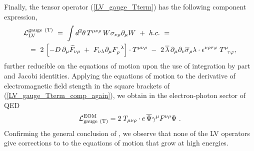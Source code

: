 \documentclass[12pt]{revtex4}
\begin{document}
Finally, the tensor operator (\ref{LV_gauge_Tterm}) has the following component 
expression,
\begin{eqnarray}
\nonumber
\lefteqn{
\mathcal{L}_{\mathrm{LV}}^{\mathrm{gauge\ (T)}}  ~=~ 
\int d^2\theta \, T^{\mu\nu\rho} \,
        W \sigma_{\nu\rho} \partial_\mu W  ~+~ h.c. ~=~ } \\
\label{LV_gauge_Tterm_comp_again}
        &&
        =~
2\,
\left[
   - D\, \partial_\mu \widetilde{F}_{\nu\rho} 
   ~+~
   F_{\nu\lambda}\partial_\mu F_\rho^{\phantom{\rho}\lambda}
\right] 
\cdot
	T^{\mu\nu\rho}
	~-~
	2\,
    	\overline{\lambda}\, \partial_\mu \partial_\nu
    	\overline{\sigma}_\rho \lambda
	\cdot
   	\epsilon^{\nu\rho\tau\varphi}
	\;
   	T^\mu_{\phantom{\mu}\tau\varphi},
\end{eqnarray}
 further reducible on the equations of motion
upon the use of integration by part and Jacobi identities.    
Applying the equations of motion to the derivative of
electromagnetic field stength in the square brackets of 
(\ref{LV_gauge_Tterm_comp_again}), we obtain in the
electron-photon sector of QED
\begin{eqnarray}
        \mathcal{L}_{\rm gauge\ (T)}^{\rm EOM} =  
\label{LV_induced_by_gauge_T}
	2\; T_{\mu\nu\rho} \cdot 
	e\, \overline{\Psi} \gamma^\mu F^{\nu\rho} \Psi
	~.
\end{eqnarray}
Confirming the general conclusion of 
\cite{GrootNibbelink:2004za}, we observe 
that none of the LV operators give corrections to
to the equations of motion that grow at high energies. 
\end{document}

